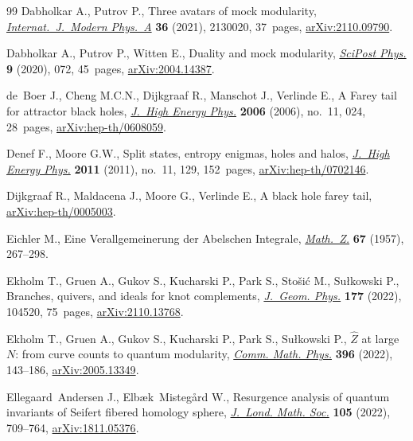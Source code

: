 \begin{thebibliography}{99}
Dabholkar A., Putrov P., Three avatars of mock modularity,
 \href{https://doi.org/10.1142/S0217751X21300209}{\textit{Internat.~J.~Modern Phys.~A}} \textbf{36} (2021), 2130020, 37~pages,
 \href{https://arxiv.org/abs/2110.09790}{arXiv:2110.09790}.

Dabholkar A., Putrov P., Witten E., Duality and mock modularity,
 \href{https://doi.org/10.21468/scipostphys.9.5.072}{\textit{SciPost Phys.}} \textbf{9} (2020), 072, 45~pages, \href{https://arxiv.org/abs/2004.14387}{arXiv:2004.14387}.

de~Boer J., Cheng M.C.N., Dijkgraaf R., Manschot J., Verlinde E., A {F}arey
 tail for attractor black holes, \href{https://doi.org/10.1088/1126-6708/2006/11/024}{\textit{J.~High Energy Phys.}} \textbf{2006}
 (2006), no.~11, 024, 28~pages, \href{https://arxiv.org/abs/hep-th/0608059}{arXiv:hep-th/0608059}.

Denef F., Moore G.W., Split states, entropy enigmas, holes and halos,
 \href{https://doi.org/10.1007/JHEP11(2011)129}{\textit{J.~High Energy Phys.}} \textbf{2011} (2011), no.~11, 129, 152~pages,
 \href{https://arxiv.org/abs/hep-th/0702146}{arXiv:hep-th/0702146}.

Dijkgraaf R., Maldacena J., Moore G., Verlinde E., A black hole farey tail,
 \href{https://arxiv.org/abs/hep-th/0005003}{arXiv:hep-th/0005003}.

Eichler M., Eine {V}erallgemeinerung der {A}belschen {I}ntegrale,
 \href{https://doi.org/10.1007/BF01258863}{\textit{Math.~Z.}} \textbf{67} (1957), 267--298.

Ekholm T., Gruen A., Gukov S., Kucharski P., Park S., Sto\v{s}i\'c M.,
 Su{\l}kowski P., Branches, quivers, and ideals for knot complements,
 \href{https://doi.org/10.1016/j.geomphys.2022.104520}{\textit{J.~Geom. Phys.}} \textbf{177} (2022), 104520, 75~pages,
 \href{https://arxiv.org/abs/2110.13768}{arXiv:2110.13768}.

Ekholm T., Gruen A., Gukov S., Kucharski P., Park S., Su{\l}kowski P.,
 {$\hat{Z}$} at large {$N$}: from curve counts to quantum modularity,
 \href{https://doi.org/10.1007/s00220-022-04469-9}{\textit{Comm. Math. Phys.}} \textbf{396} (2022), 143--186,
 \href{https://arxiv.org/abs/2005.13349}{arXiv:2005.13349}.

Ellegaard~Andersen J., Elb{\ae}k~Misteg{\r{a}}rd W., Resurgence analysis of
 quantum invariants of {S}eifert fibered homology sphere, \href{https://doi.org/10.1112/jlms.12506}{\textit{J.~Lond.
 Math. Soc.}} \textbf{105} (2022), 709--764, \href{https://arxiv.org/abs/1811.05376}{arXiv:1811.05376}.


\end{thebibliography}
